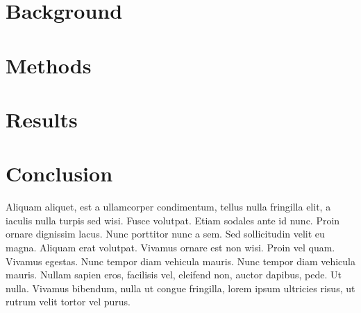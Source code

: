 \documentclass[11pt]{article}
\begin{document}
\section{Background}

\section{Methods}



\section{Results}



\section{Conclusion}
\label{sec:conclusion}
\vspace{-0.2in}
%
Aliquam aliquet, est a ullamcorper condimentum, tellus nulla fringilla elit, a iaculis nulla turpis sed wisi. Fusce volutpat. Etiam sodales ante id nunc. Proin ornare dignissim lacus. Nunc porttitor nunc a sem. Sed sollicitudin velit eu magna. Aliquam erat volutpat. Vivamus ornare est non wisi. Proin vel quam. Vivamus egestas. Nunc tempor diam vehicula mauris. Nunc tempor diam vehicula mauris. Nullam sapien eros, facilisis vel, eleifend non, auctor dapibus, pede. Ut nulla. Vivamus bibendum, nulla ut congue fringilla, lorem ipsum ultricies risus, ut rutrum velit tortor vel purus.
\end{document}
